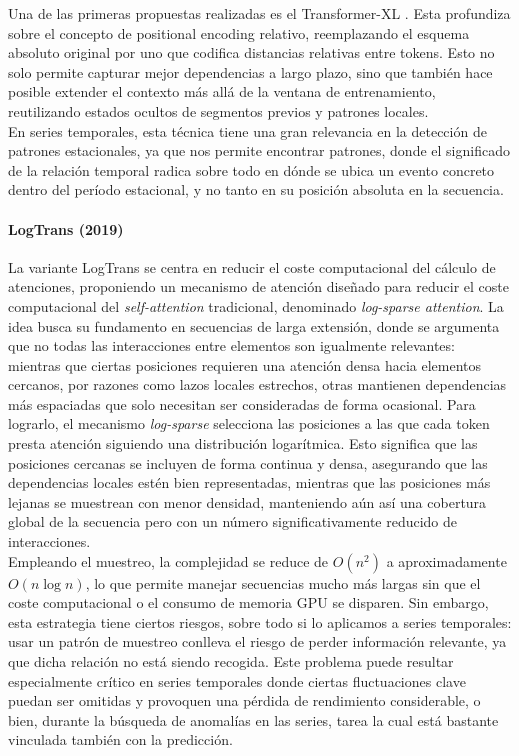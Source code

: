 Una de las primeras propuestas realizadas es el Transformer-XL \cite{dai2019transformerxlattentivelanguagemodels}. Esta profundiza sobre el concepto de positional encoding relativo, reemplazando el esquema absoluto original por uno que codifica distancias relativas entre tokens. Esto no solo permite capturar mejor dependencias a largo plazo, sino que también hace posible extender el contexto más allá de la ventana de entrenamiento, reutilizando estados ocultos de segmentos previos y patrones locales.\\

En series temporales, esta técnica tiene una gran relevancia en la detección de patrones estacionales, ya que nos permite encontrar patrones, donde el significado de la relación temporal radica sobre todo en dónde se ubica un evento concreto dentro del período estacional, y no tanto en su posición absoluta en la secuencia.

\newpage

\paragraph{LogTrans (2019)}

La variante LogTrans\cite{NEURIPS2019_6775a063} se centra en reducir el coste computacional del cálculo de atenciones, proponiendo un mecanismo de atención diseñado para reducir el coste computacional del \textit{self-attention} tradicional, denominado \textit{log-sparse attention}. La idea busca su fundamento en secuencias de larga extensión, donde se argumenta que no todas las interacciones entre elementos son igualmente relevantes: mientras que ciertas posiciones requieren una atención densa hacia elementos cercanos, por razones como lazos locales estrechos, otras mantienen dependencias más espaciadas que solo necesitan ser consideradas de forma ocasional. Para lograrlo, el mecanismo \textit{log-sparse} selecciona las posiciones a las que cada token presta atención siguiendo una distribución logarítmica. Esto significa que las posiciones cercanas se incluyen de forma continua y densa, asegurando que las dependencias locales estén bien representadas, mientras que las posiciones más lejanas se muestrean con menor densidad, manteniendo aún así una cobertura global de la secuencia pero con un número significativamente reducido de interacciones.\\

Empleando el muestreo, la complejidad se reduce de \(O(n^2)\) a aproximadamente \(O(n \log n)\), lo que permite manejar secuencias mucho más largas sin que el coste computacional o el consumo de memoria GPU se disparen. Sin embargo, esta estrategia tiene ciertos riesgos, sobre todo si lo aplicamos a series temporales: usar un patrón de muestreo conlleva el riesgo de perder información relevante, ya que dicha relación no está siendo recogida. Este problema puede resultar especialmente crítico en series temporales donde ciertas fluctuaciones clave puedan ser omitidas y provoquen una pérdida de rendimiento considerable, o bien, durante la búsqueda de anomalías en las series, tarea la cual está bastante vinculada también con la predicción.\\

